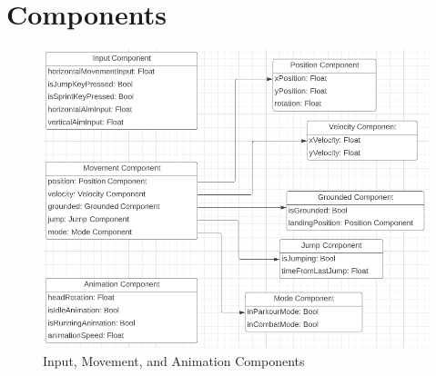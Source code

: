 \documentclass{article}
\begin{document}
\section*{Components}

\begin{figure}
\includegraphics[width=\textwidth]{Components}
	\caption{Input, Movement, and Animation Components}
\end{figure}
\end{document}

